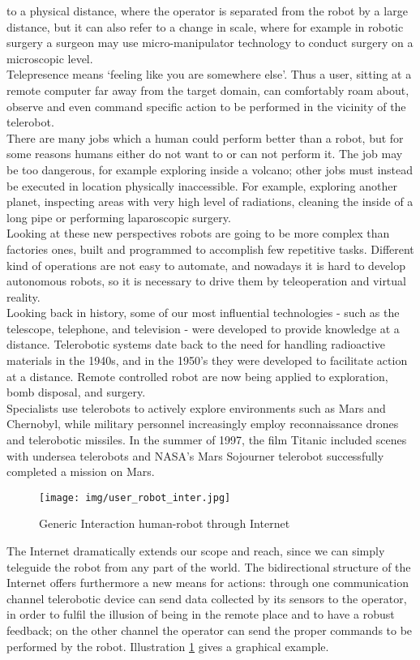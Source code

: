 to a physical distance, where the operator is separated from the robot
by a large distance, but it can also refer to a change in scale, where
for example in robotic surgery a surgeon may use micro-manipulator
technology to conduct surgery on a microscopic level.
\\
Telepresence means `feeling like you are somewhere else'.
Thus a user, sitting at a remote computer far away from the target
domain, can comfortably roam about, observe and even command
specific action to be performed in the vicinity of the telerobot.
\\
There are many jobs which a human could perform better than a robot, but
for some reasons humans either do not want to or can not perform it.
The job may be too dangerous, for example exploring inside a volcano;
other jobs must instead be executed in location physically inaccessible.
For example, exploring another planet, inspecting areas with very high
level of radiations, cleaning the inside of a long pipe or performing
laparoscopic surgery.
\\
Looking at these new perspectives robots are going to be more complex
than factories ones, built and programmed to accomplish few repetitive
tasks. Different kind of operations are not easy
to automate, and nowadays it is hard to develop autonomous robots, so
it is necessary to drive them by teleoperation and virtual reality.
\\
Looking back in history, some of our most influential technologies
- such as the telescope,
telephone, and television - were developed to provide knowledge
at a distance. Telerobotic systems date back to the need for handling
radioactive materials in the 1940s, and in the 1950's they were developed
to facilitate action at a distance. Remote controlled robot are now
being applied to exploration, bomb disposal, and surgery.
\\
Specialists use telerobots to actively explore environments such
as Mars and Chernobyl, while military personnel increasingly employ
reconnaissance drones and telerobotic missiles.
In the summer of 1997, the film Titanic included scenes with undersea
telerobots and NASA's Mars Sojourner telerobot successfully
completed a mission on Mars.

\begin{figure}
  \begin{center}
    \texttt{[image: img/user\_robot\_inter.jpg]}
    \caption{Generic Interaction human-robot through Internet}
    \label{fig:user_robot_inter}
  \end{center}
\end{figure}

The Internet dramatically extends our scope and reach, since we can simply
teleguide the robot from any part of the world. The bidirectional
structure of the Internet offers furthermore a new means for actions:
through one communication channel telerobotic device can send data
collected by its sensors to the operator, in order to fulfil the
illusion of being in the remote place and to have a robust feedback;
on the other channel the operator can send the proper commands to
be performed by the robot. Illustration \ref{fig:user_robot_inter}
gives a graphical example.
